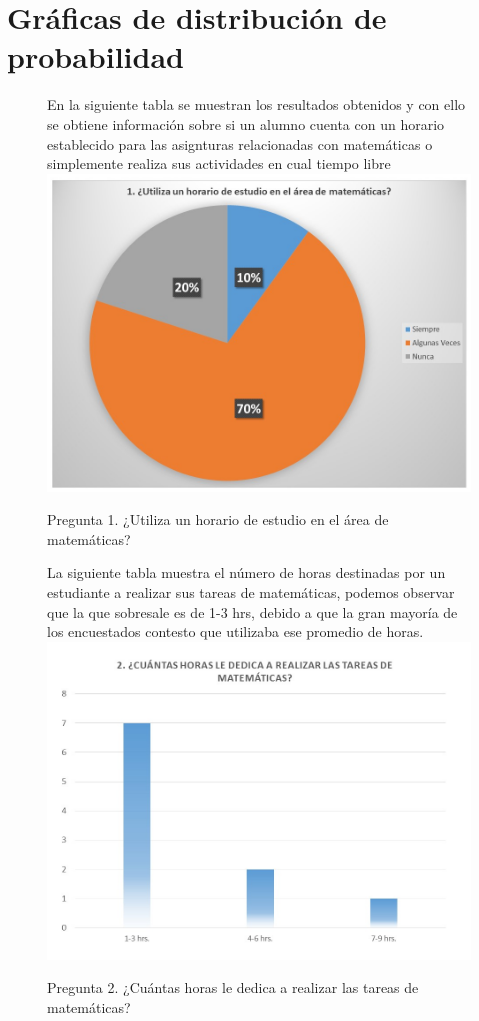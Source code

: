 \documentclass[12pt] {report}
\begin{document}
\section{Gráficas de distribución de probabilidad }
\begin{figure}[H]
\centering
En la siguiente tabla se muestran los resultados obtenidos y con ello se obtiene información sobre si un alumno cuenta con un horario establecido para las asignturas relacionadas con matemáticas o simplemente realiza sus actividades en cual tiempo libre 
\includegraphics[scale=.7]{pregunta1.JPG}
\caption{Pregunta 1. ¿Utiliza un horario de estudio en el área de matemáticas?}
\end{figure}
\begin{figure}[H]
\centering
La siguiente tabla muestra el número de horas destinadas por un estudiante a realizar sus tareas de matemáticas, podemos observar que la que sobresale es de 1-3 hrs, debido a que la gran mayoría de los encuestados contesto que utilizaba ese promedio de horas.
\includegraphics[scale=.7]{pregunta2.JPG}
\caption{Pregunta 2. ¿Cuántas horas le dedica a realizar las tareas de matemáticas?}
\end{figure}
\end{document}
